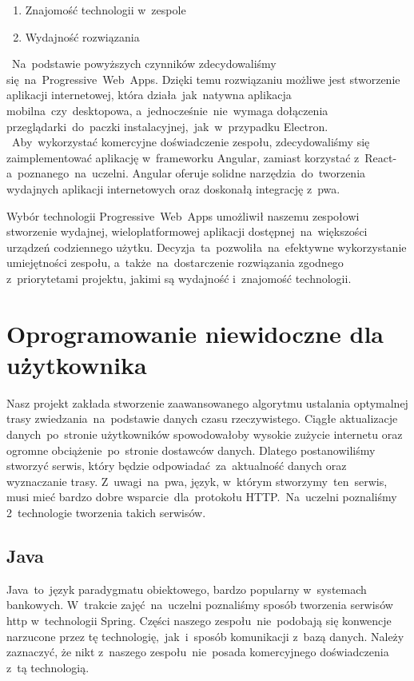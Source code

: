 \begin{enumerate}
    \item Znajomość technologii w~zespole
    \item Wydajność rozwiązania
\end{enumerate}
~Na~podstawie powyższych czynników zdecydowaliśmy się~na~Progressive~Web~Apps.
Dzięki temu rozwiązaniu możliwe jest stworzenie aplikacji internetowej, która działa~jak~natywna aplikacja mobilna~czy~desktopowa, a~jednocześnie~nie~wymaga dołączenia przeglądarki~do~paczki instalacyjnej,~jak~w~przypadku Electron.
~Aby~wykorzystać komercyjne doświadczenie zespołu, zdecydowaliśmy się zaimplementować aplikację w~frameworku Angular, zamiast korzystać z~React-a~poznanego~na~uczelni.
Angular oferuje solidne narzędzia~do~tworzenia wydajnych aplikacji internetowych oraz doskonałą integrację z~\acrshort{pwa}.

Wybór technologii Progressive~Web~Apps umożliwił naszemu zespołowi stworzenie wydajnej, wieloplatformowej aplikacji dostępnej~na~większości urządzeń codziennego użytku.
Decyzja~ta~pozwoliła~na~efektywne wykorzystanie umiejętności zespołu, a~także~na~dostarczenie rozwiązania zgodnego z~priorytetami projektu, jakimi są wydajność i~znajomość technologii.

\section{Oprogramowanie niewidoczne dla użytkownika}
\label{sec:oprogramowanie-niewidoczne-dla-uzytkownika}
Nasz projekt zakłada stworzenie zaawansowanego algorytmu ustalania optymalnej trasy zwiedzania~na~podstawie danych czasu rzeczywistego.
Ciągłe aktualizacje danych~po~stronie użytkowników spowodowałoby wysokie zużycie internetu oraz ogromne obciążenie~po~stronie dostawców danych.
Dlatego postanowiliśmy stworzyć serwis, który będzie odpowiadać~za~aktualność danych oraz wyznaczanie trasy.
Z~uwagi~na~\acrshort{pwa}, język, w~którym stworzymy~ten~serwis, musi mieć bardzo dobre wsparcie~dla~protokołu HTTP\@.~Na~uczelni poznaliśmy 2~technologie tworzenia takich serwisów.

\subsection{Java}\label{subsec:java}
Java~to~język paradygmatu obiektowego, bardzo popularny w~systemach bankowych.
W~trakcie zajęć~na~uczelni poznaliśmy sposób tworzenia serwisów \acrshort{http} w~technologii Spring.
Części naszego zespołu~nie~podobają się konwencje narzucone przez tę technologię,~jak~i~sposób komunikacji z~bazą danych.
Należy zaznaczyć, że nikt z~naszego zespołu~nie~posada komercyjnego doświadczenia z~tą technologią.

